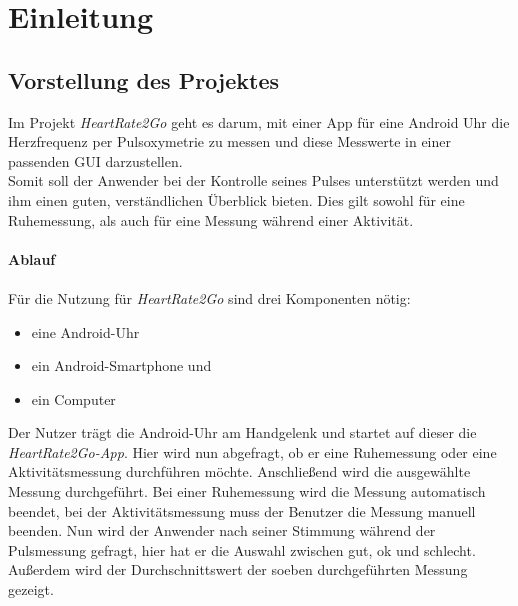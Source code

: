 \newpage
\section{Einleitung} \label{sec:Einleitung}
\subsection{Vorstellung des Projektes} \label{sec:Vorstellung des Projektes}
Im Projekt \textit{HeartRate2Go} geht es darum, mit einer App für eine Android Uhr die Herzfrequenz per Pulsoxymetrie zu messen und diese Messwerte in einer passenden GUI darzustellen. \\
Somit soll der Anwender bei der Kontrolle seines Pulses unterstützt werden und ihm einen guten, verständlichen Überblick bieten. Dies gilt sowohl für eine Ruhemessung, als auch für eine Messung während einer Aktivität. \\
\\
\textbf{Ablauf}\\
\\
Für die Nutzung für \textit{HeartRate2Go} sind drei Komponenten nötig:\\
\begin{itemize}
	\item eine Android-Uhr
	\item ein Android-Smartphone und
	\item ein Computer
\end{itemize}
Der Nutzer trägt die Android-Uhr am Handgelenk und startet auf dieser die \textit{HeartRate2Go-App}. Hier wird nun abgefragt, ob er eine Ruhemessung oder eine Aktivitätsmessung durchführen möchte. Anschließend wird die ausgewählte Messung durchgeführt. Bei einer Ruhemessung wird die Messung automatisch beendet, bei der Aktivitätsmessung muss der Benutzer die Messung manuell beenden. 
Nun wird der Anwender nach seiner Stimmung während der Pulsmessung gefragt, hier hat er die Auswahl zwischen gut, ok und schlecht. Außerdem wird der Durchschnittswert der soeben durchgeführten Messung gezeigt.\\
